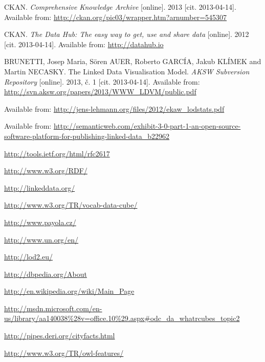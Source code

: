 \begin{thebibliography}{99}
 {\sc }
 CKAN. 
 \emph{Comprehensive Knowledge Archive}
 [online]. 2013
 [cit. 2013-04-14]. Available from: \url{http://ckan.org/pic03/wrapper.htm?arnumber=545307}

 {\sc }
CKAN.
 \emph{The Data Hub: The easy way to get, use and share data}
 [online]. 2012
 [cit. 2013-04-14]. Available from: \url{http://datahub.io}

 {\sc BRUNETTI,} Josep Maria, Sören AUER, Roberto GARCÍA, Jakub KLÍMEK and Martin NECASKY.
 The Linked Data Visualisation Model.
 \emph{AKSW Subversion Repository} [online]. 2013, č. 1 [cit. 2013-04-14].
 Available from: \url{http://svn.aksw.org/papers/2013/WWW_LDVM/public.pdf}

Available from: \url{http://jens-lehmann.org/files/2012/ekaw_lodstats.pdf}

Available from: \url{http://semanticweb.com/exhibit-3-0-part-1-an-open-source-software-platform-for-publishing-linked-data_b22962}

\url{http://tools.ietf.org/html/rfc2617}

\url{http://www.w3.org/RDF/}

\url{http://linkeddata.org/}

\url{http://www.w3.org/TR/vocab-data-cube/}

\url{http://www.payola.cz/}

\url{http://www.un.org/en/}

\url{http://lod2.eu/}

\url{http://dbpedia.org/About}

\url{http://en.wikipedia.org/wiki/Main_Page}

\url{http://msdn.microsoft.com/en-us/library/aa140038%28v=office.10%29.aspx#odc_da_whatrcubes_topic2}

\url{http://pipes.deri.org/cityfacts.html}

\url{http://www.w3.org/TR/owl-features/}\








\end{thebibliography}
